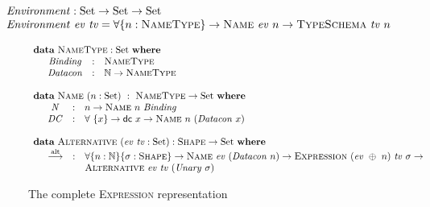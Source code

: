 \documentclass[a4paper]{jfp}
\begin{document}
\begin{displaymath}
   \begin{array}{l}
   \mathit{Environment} : \text{Set} \rightarrow  \text{Set} \rightarrow \text{Set} \\
  \mathit{Environment}\ \mathit{ev}\ \mathit{tv} = \forall \{n : \textsc{NameType} \} \rightarrow \textsc{Name}\ \mathit{ev}\ n \rightarrow
  \textsc{TypeSchema}\ \mathit{tv}\ n 
        \end{array}
\end{displaymath}

\begin{figure}
   \caption{The complete \textsc{Expression} representation}
   \begin{displaymath}
      \begin{array}{l}
         \textbf{data}\ \textsc{NameType} : \text{Set}\ \textbf{where} \\
         \quad \begin{array}{cll}
            \mathit{Binding} & : & \textsc{NameType} \\
            \mathit{Datacon} & : & \mathbb{N} \rightarrow \textsc{NameType}
         \end{array} \\ \\
         \textbf{data}\ \textsc{Name}\ (n : \text{Set})\ :\ \textsc{NameType} \rightarrow \text{Set}\ \textbf{where} \\
         \quad \begin{array}{cll}
            \mathit{N} & : & n \rightarrow \textsc{Name}\ n\ \mathit{Binding} \\
            \mathit{DC} & : & \forall\ \{ x \} \rightarrow \textsf{dc}\ x \rightarrow \textsc{Name}\ n\ (\mathit{Datacon}\ x)
         \end{array} \\ \\
         \textbf{data}\ \textsc{Alternative}\ (\mathit{ev}\ \mathit{tv} : \text{Set}) : \textsc{Shape} \rightarrow \text{Set}\ \textbf{where} \\
         \quad \begin{array}{lll}
            \stackrel{\text{alt}}{\longrightarrow} & : & \forall \{ n : \mathbb{N} \}\{\sigma : \textsc{Shape}\} \rightarrow \textsc{Name}\ \mathit{ev}\ (\mathit{Datacon}\ n)
      \rightarrow \textsc{Expression}\ (\mathit{ev}\ \oplus\ n)\ \mathit{tv}\ \sigma \rightarrow \\ & & \textsc{Alternative}\ \mathit{ev}\ \mathit{tv}\
   (\mathit{Unary}\ \sigma)

\end{array}
\end{array}
\end{displaymath}
\end{figure}
\end{document}
